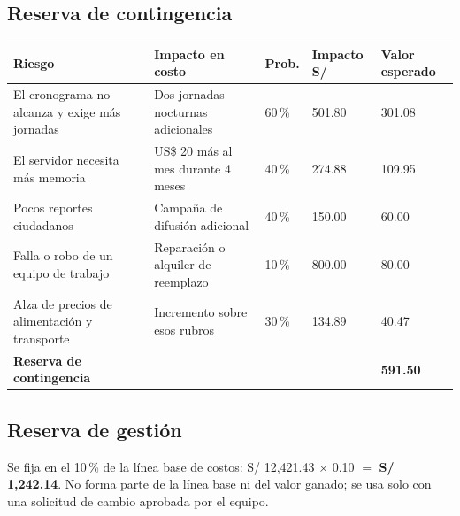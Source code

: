 \documentclass[11pt,a4paper]{article}
\begin{document}
\subsection{Reserva de contingencia}
{\small
{}
\noindent\begin{tabularx}{\textwidth}{@{}L P{3.9cm} C{1.4cm} Q{1.6cm} Q{1.7cm}@{}}
\toprule
{}
\textbf{Riesgo} & \textbf{Impacto en costo} & \textbf{Prob.} & \textbf{Impacto S/} & \textbf{Valor esperado} \\
\midrule
El cronograma no alcanza y exige más jornadas & Dos jornadas nocturnas adicionales & 60\,\% & 501.80 & 301.08 \\
El servidor necesita más memoria & US\$ 20 más al mes durante 4 meses & 40\,\% & 274.88 & 109.95 \\
Pocos reportes ciudadanos & Campaña de difusión adicional & 40\,\% & 150.00 & 60.00 \\
Falla o robo de un equipo de trabajo & Reparación o alquiler de reemplazo & 10\,\% & 800.00 & 80.00 \\
Alza de precios de alimentación y transporte & Incremento sobre esos rubros & 30\,\% & 134.89 & 40.47 \\
\midrule
{}\textbf{Reserva de contingencia} & & & & \textbf{591.50} \\
\bottomrule
\end{tabularx}
}

\vspace{0.2cm}
\subsection{Reserva de gestión}
Se fija en el 10\,\% de la línea base de costos: S/ 12,421.43 $\times$ 0.10 $=$ \textbf{S/ 1,242.14}. No forma parte de la línea base ni del valor ganado; se usa solo con una solicitud de cambio aprobada por el equipo.

\end{document}

